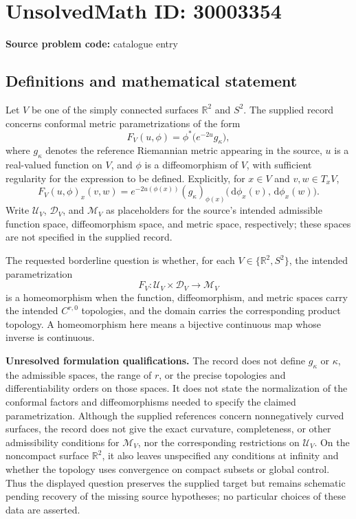 \documentclass[11pt]{article}
\newcommand{\R}{\mathbb{R}}
\newcommand{\dd}{\,\mathrm{d}}
\begin{document}
\section*{UnsolvedMath ID: 30003354}
\textbf{Source problem code:} catalogue entry
\subsection{Definitions and mathematical statement}
Let \(V\) be one of the simply connected surfaces \(\R^2\) and \(S^2\). The supplied record concerns conformal metric parametrizations of the form
\[
F_V(u,\phi)=\phi^*\bigl(e^{-2u}g_\kappa\bigr),
\]
where \(g_\kappa\) denotes the reference Riemannian metric appearing in the source, \(u\) is a real-valued function on \(V\), and \(\phi\) is a diffeomorphism of \(V\), with sufficient regularity for the expression to be defined. Explicitly, for \(x\in V\) and \(v,w\in T_xV\),
\[
F_V(u,\phi)_x(v,w)
=e^{-2u(\phi(x))}(g_\kappa)_{\phi(x)}
\bigl(\dd\phi_x(v),\dd\phi_x(w)\bigr).
\]
Write \(\mathcal U_V\), \(\mathcal D_V\), and \(\mathcal M_V\) as placeholders for the source's intended admissible function space, diffeomorphism space, and metric space, respectively; these spaces are not specified in the supplied record.

The requested borderline question is whether, for each \(V\in\{\R^2,S^2\}\), the intended parametrization
\[
F_V:\mathcal U_V\times\mathcal D_V\longrightarrow\mathcal M_V
\]
is a homeomorphism when the function, diffeomorphism, and metric spaces carry the intended \(C^{r,0}\) topologies, and the domain carries the corresponding product topology. A homeomorphism here means a bijective continuous map whose inverse is continuous.

\textbf{Unresolved formulation qualifications.} The record does not define \(g_\kappa\) or \(\kappa\), the admissible spaces, the range of \(r\), or the precise topologies and differentiability orders on those spaces. It does not state the normalization of the conformal factors and diffeomorphisms needed to specify the claimed parametrization. Although the supplied references concern nonnegatively curved surfaces, the record does not give the exact curvature, completeness, or other admissibility conditions for \(\mathcal M_V\), nor the corresponding restrictions on \(\mathcal U_V\). On the noncompact surface \(\R^2\), it also leaves unspecified any conditions at infinity and whether the topology uses convergence on compact subsets or global control. Thus the displayed question preserves the supplied target but remains schematic pending recovery of the missing source hypotheses; no particular choices of these data are asserted.
\end{document}
